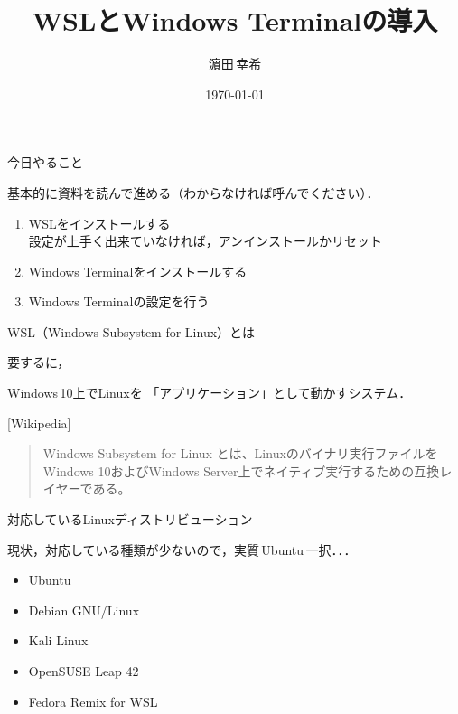 \documentclass[dvipsnames,usenames,aspectratio=169,12pt]{beamer}
\title{WSLとWindows Terminalの導入}
\author{濵田\,幸希}
\date{\today}
\begin{document}
\maketitle

\begin{frame}{今日やること}

基本的に資料を読んで進める（わからなければ呼んでください）．

\vspace{10pt}

\begin{enumerate}
\item WSLをインストールする\\
\vspace{3pt}
設定が上手く出来ていなければ，アンインストールかリセット
\vspace{5pt}
\item Windows Terminalをインストールする
\vspace{5pt}
\item Windows Terminalの設定を行う
\end{enumerate}

\end{frame}

\begin{frame}{WSL（Windows Subsystem for Linux）とは}


要するに，\vspace{3pt}

Windows\,10上でLinuxを
「\alert{アプリケーション}」として動かすシステム．

\vspace{10pt}

\begin{quoteblock}{}[Wikipedia]
\begin{quote}
Windows Subsystem for Linux とは、Linuxのバイナリ実行ファイルをWindows 10およびWindows Server上でネイティブ実行するための互換レイヤーである。
\end{quote}
\end{quoteblock}

\end{frame}

\begin{frame}{対応しているLinuxディストリビューション}

現状，対応している種類が少ないので，実質\,\alert{Ubuntu}\,一択．．．

\vspace{10pt}
\begin{itemize}
\item Ubuntu
\vspace{5pt}
\item Debian GNU/Linux
\vspace{5pt}
\item Kali Linux
\vspace{5pt}
\item OpenSUSE Leap 42
\vspace{5pt}
\item Fedora Remix for WSL
\end{itemize}

\end{frame}
\end{document}
